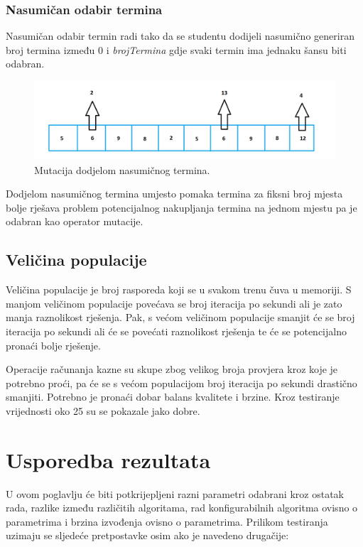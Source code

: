 \documentclass[times, utf8, zavrsni]{fer}
\begin{document}
\subsection{Nasumičan odabir termina}

Nasumičan odabir termin radi tako da se studentu dodijeli nasumično generiran broj termina između 0 i \emph{brojTermina} gdje svaki termin ima jednaku šansu biti odabran.

\begin{figure}[htb]
\centering
\includegraphics[width=15cm]{images/mut_rand.png}
\caption{Mutacija dodjelom nasumičnog termina.}
\label{fig:mut_rand}
\end{figure}

Dodjelom nasumičnog termina umjesto pomaka termina za fiksni broj mjesta bolje rješava problem potencijalnog nakupljanja termina na jednom mjestu pa je odabran kao operator mutacije.

\section{Veličina populacije}

Veličina populacije je broj rasporeda koji se u svakom trenu čuva u memoriji. S manjom veličinom populacije povećava se broj iteracija po sekundi ali je zato manja raznolikost rješenja. Pak, s većom veličinom populacije smanjit će se broj iteracija po sekundi ali će se povećati raznolikost rješenja te će se potencijalno pronaći bolje rješenje.

Operacije računanja kazne su skupe zbog velikog broja provjera kroz koje je potrebno proći, pa će se s većom populacijom broj iteracija po sekundi drastično smanjiti. Potrebno je pronaći dobar balans kvalitete i brzine. Kroz testiranje vrijednosti oko 25 su se pokazale jako dobre.

\chapter{Usporedba rezultata}

U ovom poglavlju će biti potkrijepljeni razni parametri odabrani kroz ostatak rada, razlike između različitih algoritama, rad konfigurabilnih algoritma ovisno o parametrima i brzina izvođenja ovisno o parametrima. Prilikom testiranja uzimaju se sljedeće pretpostavke osim ako je navedeno drugačije:
\end{document}
